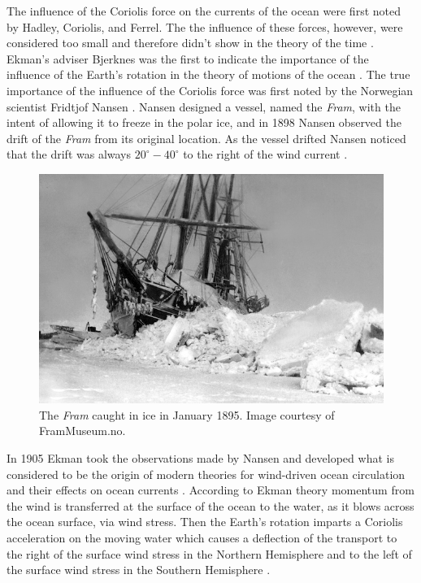 The influence of the Coriolis force on the currents of the ocean were first
noted by Hadley, Coriolis, and Ferrel. The the influence of these forces,
however, were considered too small and therefore didn't show in the theory of
the time \cite{Ekman1905}. Ekman's adviser Bjerknes was the first to indicate
the importance of the influence of the Earth's rotation in the theory of motions
of the ocean \cite{Ekman1905}. The true importance of the influence of the
Coriolis force was first noted by the Norwegian scientist Fridtjof Nansen
\cite{Beesley2008, Ekman1905}. Nansen designed a vessel, named the \emph{Fram},
with the intent of allowing it to freeze in the polar ice, and in 1898 Nansen
observed the drift of the \emph{Fram} from its original location. As the vessel
drifted Nansen noticed that the drift was always $20^\circ - 40^\circ$ to the
right of the wind current \cite{Beesley2008}.

\begin{figure}
  \includegraphics[scale=0.35]{Figures/Fram.jpg}
  \caption{The \emph{Fram} caught in ice in January 1895. Image courtesy of
  FramMuseum.no.}
  \label{fig:Fram}
\end{figure}
In 1905 Ekman \cite{Ekman1905} took the observations made by Nansen and developed
what is considered to be the origin of modern theories for wind-driven ocean
circulation and their effects on ocean currents \cite{Price1987}. According to
Ekman theory momentum from the wind is transferred at the surface of the ocean
to the water, as it blows across the ocean surface, via wind stress. Then the
Earth's rotation imparts a Coriolis acceleration on the moving water which
causes a deflection of the transport to the right of the surface wind stress in
the Northern Hemisphere and to the left of the surface wind stress in the
Southern Hemisphere \cite{Beesley2008}.

